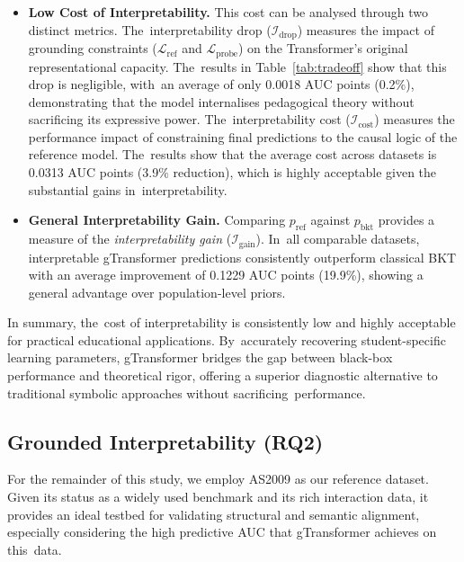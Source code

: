 \documentclass[applsci,article,accept,moreauthors,pdftex]{Definitions/mdpi}
\begin{document}
\begin{itemize}
    \item \textbf{Low Cost of Interpretability.} This cost can be {analysed} through two distinct metrics. The~interpretability drop ($\mathcal{I}_{\text{drop}}$) measures the impact of grounding constraints ($\mathcal{L}_{\text{ref}}$ and $\mathcal{L}_{\text{probe}}$) on the Transformer's original representational capacity. The~results in Table~\ref{tab:tradeoff} show that this drop is negligible, with~an average of only 0.0018 AUC points (0.2\%), demonstrating that the model {internalises} pedagogical theory without sacrificing its expressive power. The~interpretability cost ($\mathcal{I}_{\text{cost}}$) measures the performance impact of constraining final predictions to the causal logic of the reference model. The~results show that the average cost across datasets is 0.0313 AUC points (3.9\% reduction), which is highly acceptable given the substantial gains in~interpretability.
    
    \item \textbf{General Interpretability Gain.} Comparing $p_{\text{ref}}$ against $p_{\text{bkt}}$ provides a measure of the \textit{interpretability gain} ($\mathcal{I}_{\text{gain}}$). In~all comparable datasets, interpretable gTransformer predictions consistently outperform classical BKT with an average improvement of 0.1229 AUC points (19.9\%), showing a general advantage over population-level priors. 
\end{itemize}

In summary, the~cost of interpretability is consistently low and highly acceptable for practical educational applications. By~accurately recovering student-specific learning parameters, gTransformer bridges the gap between black-box performance and theoretical rigor, offering a superior diagnostic alternative to traditional symbolic approaches without sacrificing~performance.


\subsection{Grounded Interpretability (RQ2)} \label{sec_grounded}

For the remainder of this study, we employ AS2009 as our reference dataset. Given its status as a widely used benchmark and its rich interaction data, it provides an ideal testbed for validating structural and semantic alignment, especially considering the high predictive AUC that gTransformer achieves on this~data.
\end{document}
